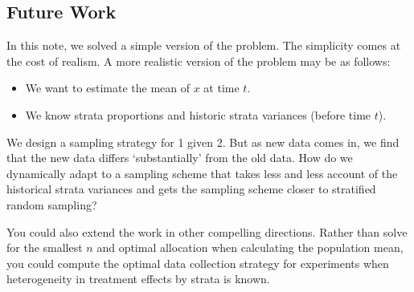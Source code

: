 \documentclass[12pt, letterpaper]{article}
\begin{document}
\subsection*{Future Work}

In this note, we solved a simple version of the problem. The simplicity comes at the cost of realism. A more realistic version of the problem may be as follows:
\begin{itemize}
    \item We want to estimate the mean of $x$ at time $t$. 
    \item We know strata proportions and historic strata variances (before time $t$).
\end{itemize}

We design a sampling strategy for 1 given 2. But as new data comes in, we find that the new data differs `substantially' from the old data. How do we dynamically adapt to a sampling scheme that takes less and less account of the historical strata variances and gets the sampling scheme closer to stratified random sampling?

You could also extend the work in other compelling directions. Rather than solve for the smallest $n$ and optimal allocation when calculating the population mean, you could compute the optimal data collection strategy for experiments when heterogeneity in treatment effects by strata is known.
\end{document}
